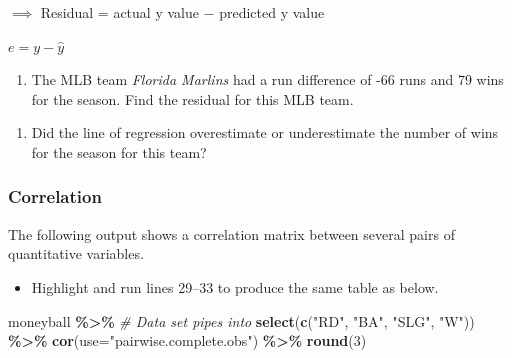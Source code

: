 \documentclass[
]{report}
\newenvironment{Shaded}{\begin{snugshade}}{\end{snugshade}}
\newcommand{\AttributeTok}[1]{\textcolor[rgb]{0.13,0.29,0.53}{#1}}
\newcommand{\CommentTok}[1]{\textcolor[rgb]{0.56,0.35,0.01}{\textit{#1}}}
\newcommand{\DecValTok}[1]{\textcolor[rgb]{0.00,0.00,0.81}{#1}}
\newcommand{\FunctionTok}[1]{\textcolor[rgb]{0.13,0.29,0.53}{\textbf{#1}}}
\newcommand{\NormalTok}[1]{#1}
\newcommand{\SpecialCharTok}[1]{\textcolor[rgb]{0.81,0.36,0.00}{\textbf{#1}}}
\newcommand{\StringTok}[1]{\textcolor[rgb]{0.31,0.60,0.02}{#1}}
\providecommand{\tightlist}{%
  \setlength{\itemsep}{0pt}\setlength{\parskip}{0pt}}
\begin{document}
\begin{center}

$\implies$ Residual = actual y value $-$ predicted y value

$e=y-\hat{y}$
\end{center}

\begin{enumerate}
\def\labelenumi{\arabic{enumi}.}
\setcounter{enumi}{7}
\tightlist
\item
  The MLB team \emph{Florida Marlins} had a run difference of -66 runs and 79 wins for the season. Find the residual for this MLB team.
\end{enumerate}

\vspace{.8in}

\begin{enumerate}
\def\labelenumi{\arabic{enumi}.}
\setcounter{enumi}{8}
\tightlist
\item
  Did the line of regression overestimate or underestimate the number of wins for the season for this team?
\end{enumerate}

\vspace{.2in}

\newpage

\subsubsection*{Correlation}\label{correlation-1}

The following output shows a correlation matrix between several pairs of quantitative variables.

\begin{itemize}
\tightlist
\item
  Highlight and run lines 29--33 to produce the same table as below.
\end{itemize}

\begin{Shaded}
\begin{Highlighting}[]
\NormalTok{moneyball }\SpecialCharTok{\%\textgreater{}\%}  \CommentTok{\# Data set pipes into}
  \FunctionTok{select}\NormalTok{(}\FunctionTok{c}\NormalTok{(}\StringTok{"RD"}\NormalTok{, }\StringTok{"BA"}\NormalTok{, }
           \StringTok{"SLG"}\NormalTok{, }\StringTok{"W"}\NormalTok{)) }\SpecialCharTok{\%\textgreater{}\%}
  \FunctionTok{cor}\NormalTok{(}\AttributeTok{use=}\StringTok{"pairwise.complete.obs"}\NormalTok{) }\SpecialCharTok{\%\textgreater{}\%}
  \FunctionTok{round}\NormalTok{(}\DecValTok{3}\NormalTok{)}
\end{Highlighting}
\end{Shaded}
\end{document}
